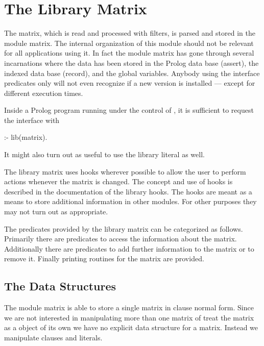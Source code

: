 
\section{The Library Matrix}
\def\PrologFILE{System/matrix.pl}

The matrix, which is read and processed with filters, is parsed and stored in
the module {\sf matrix}. The internal organization of this module should not
be relevant for all applications using it. In fact the module {\sf matrix} has
gone through several incarnations where the data has been stored in the Prolog
data base (assert), the indexed data base (record), and the \eclipse{} global
variables. Anybody using the interface predicates only will not even recognize
if a new version is installed --- except for different execution times.


Inside a Prolog program running under the control of \ProTop, it is
sufficient to request the interface with
\begin{BoxedSample}
  :- lib(matrix).
\end{BoxedSample}
It might also turn out as useful to use the library {\sf literal} as well.

The library {\sf matrix} uses hooks wherever possible to allow the user to
perform actions whenever the matrix is changed. The concept and use of hooks
is described in the documentation of the library {\sf hooks}. The hooks are
meant as a means to store additional information in other modules. For other
purposes they may not turn out as appropriate.

The predicates provided by the library {\sf matrix} can be categorized as
follows. Primarily there are predicates to access the information about the
matrix. Additionally there are predicates to add further information to the
matrix or to remove it. Finally printing routines for the matrix are provided.

\subsection{The Data Structures}\label{matrix:data.structures}

The module {\sf matrix} is able to store a single matrix in clause normal
form. Since we are not interested in manipulating more than one matrix of
treat the matrix as a object of its own we have no explicit data structure for
a matrix. Instead we manipulate clauses and literals.


